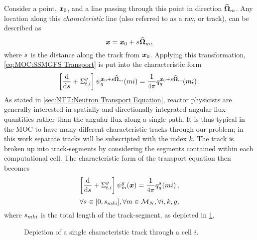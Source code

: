 {{        Consider a point, $\boldsymbol{x}_0$, and a line passing through this point in direction $\dirm$.
        Any location along this \emph{characteristic} line (also referred to as a ray, or track), can be described as
        \begin{equation}\label{eq:MOC:Characteristic Ray}
            \loc = \loc_0 + \len\dirm,
        \end{equation}
        where $\len$ is the distance along the track from $\boldsymbol{x}_0$.
        Applying this transformation, \cref{eq:MOC:SSMGFS Transport} is put into the characteristic form
        \begin{equation}\label{eq:MOC:Characteristic Form Deriv 1}
            \left[\deriv{}{\len} + \xst\right]\aflux[mi][g][\loc_0 + \len\dirm] = \rfourpi\source[mi][g][\loc_0 + \len\dirm].
        \end{equation}
        As stated in \cref{sec:NTT:Neutron Transport Equation}, reactor physicists are generally interested in spatially and directionally integrated angular flux quantities rather than the angular flux along a single path.
        It is thus typical in the \ac{MOC} to have many different characteristic tracks through our problem; in this work separate tracks will be subscripted with the index $k$.
        The track is broken up into track-segments by considering the segments contained within each computational cell.
        The characteristic form of the transport equation then becomes
        \begin{equation}\label{eq:MOC:MOC Equation Generic}
            \left[\deriv{}{\len} + \xst\right]\aflux = \rfourpi\source[mi][g][\len],
        \end{equation}
        \begin{equation*}
            \forall \len \in [0,\segl], \forall m\in\angquad, \forall i,k,g,
        \end{equation*}
        where $\segl$ is the total length of the track-segment, as depicted in \cref{fig:MOC:MOC Coordinate System}.

        \begin{figure}[h]
            \centering
            \def\svgwidth{0.4\linewidth}
            
            \caption{Depiction of a single characteristic track through a cell $i$.}
            \label{fig:MOC:MOC Coordinate System}
        \end{figure}

}}
